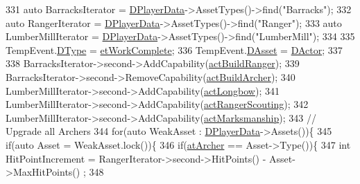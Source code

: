 \begin{DoxyCode}
331             \textcolor{keyword}{auto} BarracksIterator = \hyperlink{classCActivatedPlayerCapability_a9bf27c322a73f4b11c8183cc1973c3d8}{DPlayerData}->AssetTypes()->find(\textcolor{stringliteral}{"Barracks"});
332             \textcolor{keyword}{auto} RangerIterator = \hyperlink{classCActivatedPlayerCapability_a9bf27c322a73f4b11c8183cc1973c3d8}{DPlayerData}->AssetTypes()->find(\textcolor{stringliteral}{"Ranger"});
333             \textcolor{keyword}{auto} LumberMillIterator = \hyperlink{classCActivatedPlayerCapability_a9bf27c322a73f4b11c8183cc1973c3d8}{DPlayerData}->AssetTypes()->find(\textcolor{stringliteral}{"LumberMill"});
334             
335             TempEvent.\hyperlink{structSGameEvent_afa10562e243f4ac2b473b655cc58fee7}{DType} = \hyperlink{GameModel_8h_abfcf510bafec7c6429906a6ecaac656da0106cf4227412990140c1d773244b587}{etWorkComplete};
336             TempEvent.\hyperlink{structSGameEvent_a40c85eeac83b96887b7449c9bdc5d624}{DAsset} = \hyperlink{classCActivatedPlayerCapability_a54ca944b47bff2718330639941d402b0}{DActor};
337             
338             BarracksIterator->second->AddCapability(\hyperlink{GameDataTypes_8h_a35b98ce26aca678b03c6f9f76e4778cead539d31a3eb945161800e6342a05fb11}{actBuildRanger});
339             BarracksIterator->second->RemoveCapability(\hyperlink{GameDataTypes_8h_a35b98ce26aca678b03c6f9f76e4778ceae3af0123db77607fb381df7e49c5b48b}{actBuildArcher});
340             LumberMillIterator->second->AddCapability(\hyperlink{GameDataTypes_8h_a35b98ce26aca678b03c6f9f76e4778cea626066b8caa034d801ef8cd601cd1cd7}{actLongbow});
341             LumberMillIterator->second->AddCapability(\hyperlink{GameDataTypes_8h_a35b98ce26aca678b03c6f9f76e4778cea7c23f07dfc3362bc9b85d704b5750fd8}{actRangerScouting});
342             LumberMillIterator->second->AddCapability(\hyperlink{GameDataTypes_8h_a35b98ce26aca678b03c6f9f76e4778cea23634cb2bfdd2dcc6f6cd6433b36df36}{actMarksmanship});
343             \textcolor{comment}{// Upgrade all Archers}
344             \textcolor{keywordflow}{for}(\textcolor{keyword}{auto} WeakAsset : \hyperlink{classCActivatedPlayerCapability_a9bf27c322a73f4b11c8183cc1973c3d8}{DPlayerData}->Assets())\{
345                 \textcolor{keywordflow}{if}(\textcolor{keyword}{auto} Asset = WeakAsset.lock())\{
346                     \textcolor{keywordflow}{if}(\hyperlink{GameDataTypes_8h_a5600d4fc433b83300308921974477feca7fad0074234068ff0af4092a75b929f8}{atArcher} == Asset->Type())\{
347                         \textcolor{keywordtype}{int} HitPointIncrement = RangerIterator->second->HitPoints() - Asset->MaxHitPoints()
      ;
348                         

\end{DoxyCode}
